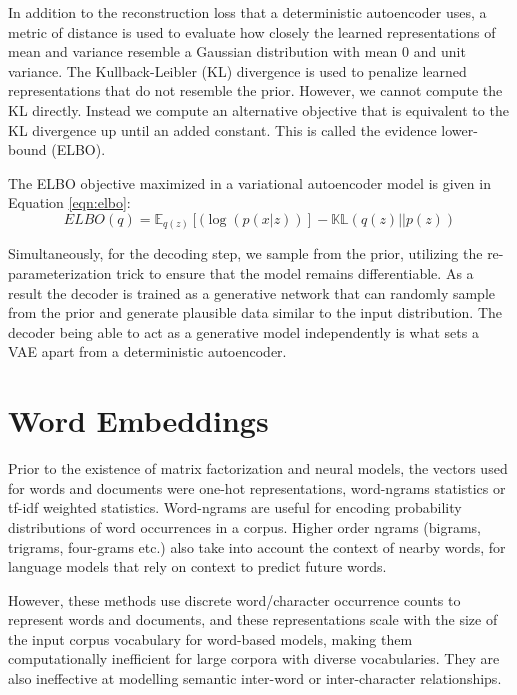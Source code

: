 In addition to the reconstruction loss that a deterministic autoencoder uses, a metric of distance is used to evaluate how closely the learned representations of mean and variance resemble a Gaussian distribution with mean 0 and unit variance. The Kullback-Leibler (KL) divergence \citep{kullback1951information} is used to penalize learned representations that do not resemble the prior. However, we cannot compute the KL directly. Instead we compute an alternative objective that is equivalent to the KL divergence up until an added constant. This is called the evidence lower-bound (ELBO).

The ELBO objective maximized in a variational autoencoder model is given in Equation \ref{eqn:elbo}:
\begin{equation} \label{eqn:elbo}
	ELBO(q) = \mathbb{E}_{q(z)} [(\log(p(x|z))] - \mathbb{KL}(q(z)||p(z))
\end{equation}

Simultaneously, for the decoding step, we sample from the prior, utilizing the re-parameterization trick to ensure that the model remains differentiable. As a result the decoder is trained as a generative network that can randomly sample from the prior and generate plausible data similar to the input distribution. The decoder being able to act as a generative model independently is what sets a VAE apart from a deterministic autoencoder.


\section{Word Embeddings}

Prior to the existence of matrix factorization and neural models, the vectors used for words and documents were one-hot representations, word-ngrams statistics \citep{brown1992class} or tf-idf weighted statistics. Word-ngrams are useful for encoding probability distributions of word occurrences in a corpus. Higher order ngrams (bigrams, trigrams, four-grams etc.) also take into account the context of nearby words, for language models that rely on context to predict future words.

However, these methods use discrete word/character occurrence counts to represent words and documents, and these representations scale with the size of the input corpus vocabulary for word-based models, making them computationally inefficient for large corpora with diverse vocabularies. They are also ineffective at modelling semantic inter-word or inter-character relationships.

